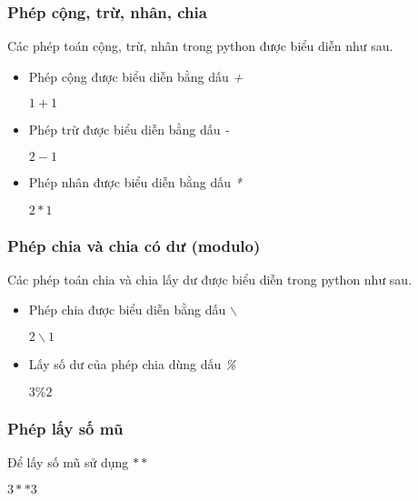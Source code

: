 \documentclass{beamer}
\begin{document}
\begin{frame}[label=congtru]
\frametitle{Phép cộng, trừ, nhân, chia}
Các phép toán cộng, trừ, nhân trong python được biểu diễn như sau.

\begin{itemize}
\item Phép cộng được biểu diễn bằng dấu \textit{+}
\begin{example}
$1 + 1$
\end{example} 
\item Phép trừ được biểu diễn bằng dấu \textit{-}
\begin{example}
$2 - 1$
\end{example} 

\item Phép nhân được biểu diễn bằng dấu \textit{*}

\begin{example}
$2 * 1$
\end{example} 

\end{itemize}

\hyperlink{pheptoan}{}
\end{frame}

\begin{frame}[label=phepchia]
\frametitle{Phép chia và chia có dư (modulo)}
Các phép toán chia và chia lấy dư được biểu diễn trong python như sau.
\begin{itemize}
\item Phép chia được biểu diễn bằng dấu \textit{$\backslash$}
\begin{example}
$2 \backslash 1$ 
\end{example} 
\item Lấy số dư của phép chia dùng dấu \textit{ \%}
\begin{example}
$3 \% 2$
\end{example} 
\end{itemize}
\hyperlink{pheptoan}{}
\end{frame}

\begin{frame}[label=laysomu]
\frametitle{Phép lấy số mũ}
Để lấy số mũ sử dụng $**$

\begin{example}
$3 ** 3$
\end{example} 

\hyperlink{pheptoan}{}
\end{frame}
\end{document}

